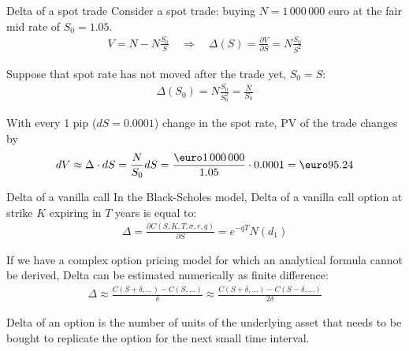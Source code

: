 \documentclass{beamer}
\renewcommand{\EUR}[1]{\textup{\euro}#1}
\begin{document}
\begin{frame}{Delta of a spot trade}
\justify
Consider a spot trade: buying $N=1\,000\,000$ euro at the fair mid rate of $S_0=1.05$.
\begin{align*}
V = N - N\frac{S_0}{S} \quad \Rightarrow \quad \Delta(S) = \frac{\partial V}{\partial S} = N\frac{S_0}{S^2}
\end{align*}

\justify
Suppose that spot rate has not moved after the trade yet, $S_0=S$:
\begin{align*}
\Delta(S_0) = N\frac{S_0}{S_0^2} = \frac{N}{S_0}
\end{align*}

\justify
With every 1 pip ($dS=0.0001$) change in the spot rate, PV of the trade changes by 
\begin{align*}
dV \approx \Delta \cdot dS = \frac{N}{S_0}dS = \frac{\EUR{1\,000\,000}}{1.05}\cdot 0.0001 = \EUR{95.24}
\end{align*}
\end{frame}



\begin{frame}{Delta of a vanilla call}
\justify
In the Black-Scholes model, Delta of a vanilla call option at strike $K$ expiring in $T$ years is equal to:
\begin{align*}
\Delta = \frac{\partial C(S, K, T, \sigma, r, q)}{\partial S} = e^{-qT}N(d_1)
\end{align*}

\justify
If we have a complex option pricing model for which an analytical formula cannot be derived, Delta can be estimated numerically as finite difference:
\begin{align*}
\Delta \approx \frac{C(S+\delta,...) - C(S,...)}{\delta} \approx \frac{C(S+\delta,...) - C(S-\delta,...)}{2\delta}
\end{align*}

\justify
Delta of an option is the number of units of the underlying asset that needs to be bought to replicate the option for the next small time interval.
\end{frame}
\end{document}
